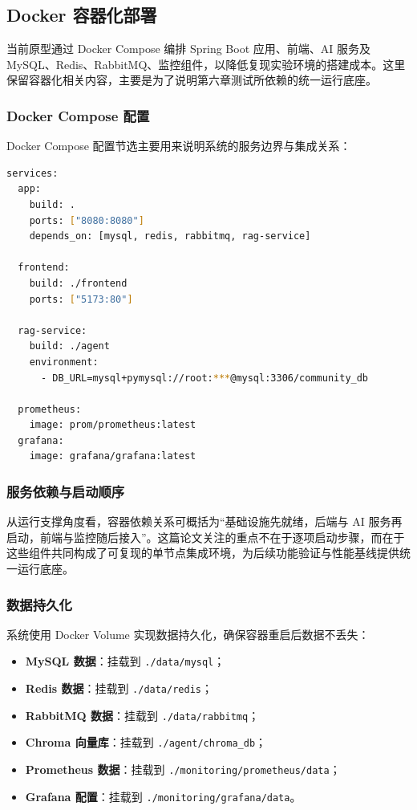 \subsection{Docker 容器化部署}

当前原型通过 Docker Compose 编排 Spring Boot 应用、前端、AI 服务及 MySQL、Redis、RabbitMQ、监控组件，以降低复现实验环境的搭建成本。这里保留容器化相关内容，主要是为了说明第六章测试所依赖的统一运行底座。

\subsubsection{Docker Compose 配置}

Docker Compose 配置节选主要用来说明系统的服务边界与集成关系：

\begin{lstlisting}[language=bash, caption=Docker Compose 核心服务（节选）]
services:
  app:
    build: .
    ports: ["8080:8080"]
    depends_on: [mysql, redis, rabbitmq, rag-service]

  frontend:
    build: ./frontend
    ports: ["5173:80"]

  rag-service:
    build: ./agent
    environment:
      - DB_URL=mysql+pymysql://root:***@mysql:3306/community_db

  prometheus:
    image: prom/prometheus:latest
  grafana:
    image: grafana/grafana:latest
\end{lstlisting}

\subsubsection{服务依赖与启动顺序}

从运行支撑角度看，容器依赖关系可概括为“基础设施先就绪，后端与 AI 服务再启动，前端与监控随后接入”。这篇论文关注的重点不在于逐项启动步骤，而在于这些组件共同构成了可复现的单节点集成环境，为后续功能验证与性能基线提供统一运行底座。

\subsubsection{数据持久化}

系统使用 Docker Volume 实现数据持久化，确保容器重启后数据不丢失：

\begin{itemize}
  \item \textbf{MySQL 数据}：挂载到 \texttt{./data/mysql}；
  \item \textbf{Redis 数据}：挂载到 \texttt{./data/redis}；
  \item \textbf{RabbitMQ 数据}：挂载到 \texttt{./data/rabbitmq}；
  \item \textbf{Chroma 向量库}：挂载到 \texttt{./agent/chroma\_db}；
  \item \textbf{Prometheus 数据}：挂载到 \texttt{./monitoring/prometheus/data}；
  \item \textbf{Grafana 配置}：挂载到 \texttt{./monitoring/grafana/data}。
\end{itemize}

